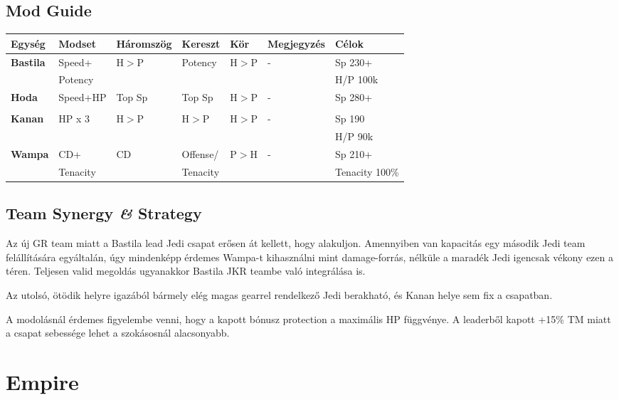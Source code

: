 \documentclass[11pt]{report}
\begin{document}
\section{Mod Guide}
\begin{center}
    \begin{tabular}{|l | l | l | l | l | l | l |}
        \hline
        Egység & Modset & Háromszög & Kereszt & Kör & Megjegyzés & Célok\\ \hline
        \textbf{Bastila} & Speed+ & H$>$P & Potency & H$>$P & - & Sp 230+\\
        & Potency &  &  &  &  & H/P 100k\\ \hline
        \textbf{Hoda} & Speed+HP & Top Sp & Top Sp & H$>$P & - & Sp 280+\\
        &  &  &  &  &  & \\ \hline                
        \textbf{Kanan} & HP x 3 & H$>$P & H$>$P & H$>$P & - & Sp 190\\
        &  &  &  &  &  & H/P 90k\\ \hline
        \textbf{Wampa} & CD+ & CD & Offense/ & P$>$H & - & Sp 210+\\
        & Tenacity &  & Tenacity &  &  & Tenacity 100\%\\ \hline
    \end{tabular}
\end{center}
\section{Team Synergy \textit{\&} Strategy}
Az új GR team miatt a Bastila lead Jedi csapat erősen át kellett, hogy alakuljon. Amennyiben van kapacitás egy második Jedi team felállítására egyáltalán, úgy mindenképp érdemes Wampa-t kihasználni mint damage-forrás, nélküle a maradék Jedi igencsak vékony ezen a téren. Teljesen valid megoldás ugyanakkor Bastila JKR teambe való integrálása is.\par
Az utolsó, ötödik helyre igazából bármely elég magas gearrel rendelkező Jedi berakható, és Kanan helye sem fix a csapatban.\par
A modolásnál érdemes figyelembe venni, hogy a kapott bónusz protection a maximális HP függvénye. A leaderből kapott +15\% TM miatt a csapat sebessége lehet a szokásosnál alacsonyabb.

\chapter{Empire}
\end{document}

